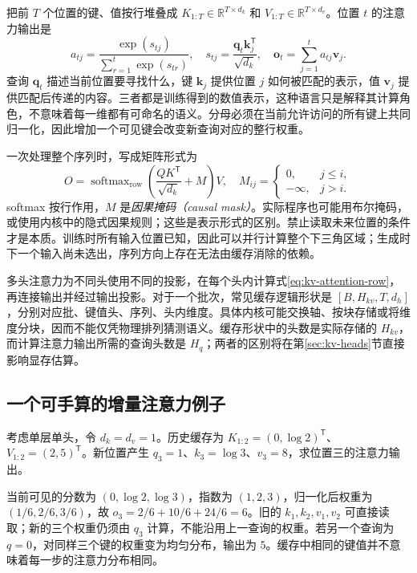 \documentclass[UTF8,12pt,a4paper,fontset=fandol]{ctexart}
\begin{document}
把前 $T$ 个位置的键、值按行堆叠成 $K_{1:T}\in\mathbb R^{T\times d_k}$ 和 $V_{1:T}\in\mathbb R^{T\times d_v}$。位置 $t$ 的注意力输出是
\begin{equation}
 a_{tj}=\frac{\exp(s_{tj})}{\sum_{r=1}^{t}\exp(s_{tr})},\quad
 s_{tj}=\frac{\mathbf q_t\mathbf k_j^{\mathsf T}}{\sqrt{d_k}},\quad
 \mathbf o_t=\sum_{j=1}^{t}a_{tj}\mathbf v_j.
 \label{eq:kv-attention-row}
\end{equation}
查询 $\mathbf q_t$ 描述当前位置要寻找什么，键 $\mathbf k_j$ 提供位置 $j$ 如何被匹配的表示，值 $\mathbf v_j$ 提供匹配后传递的内容。三者都是训练得到的数值表示，这种语言只是解释其计算角色，不意味着每一维都有可命名的语义。分母必须在当前允许访问的所有键上共同归一化，因此增加一个可见键会改变新查询对应的整行权重。

一次处理整个序列时，写成矩阵形式为
\begin{equation}
 O=\operatorname{softmax}_{\mathrm{row}}
 \left(\frac{QK^{\mathsf T}}{\sqrt{d_k}}+M\right)V,
 \quad M_{ij}=\begin{cases}0,&j\leq i,\\-\infty,&j>i.\end{cases}
 \label{eq:kv-masked-attention}
\end{equation}
softmax 按行作用，$M$ 是\emph{因果掩码（causal mask）}。实际程序也可能用布尔掩码，或使用内核中的隐式因果规则；这些是表示形式的区别。禁止读取未来位置的条件才是本质。训练时所有输入位置已知，因此可以并行计算整个下三角区域；生成时下一个输入尚未选出，序列方向上存在无法由缓存消除的依赖。

多头注意力为不同头使用不同的投影，在每个头内计算式\eqref{eq:kv-attention-row}，再连接输出并经过输出投影。对于一个批次，常见缓存逻辑形状是 $[B,H_{kv},T,d_h]$，分别对应批、键值头、序列、头内维度。具体内核可能交换轴、按块存储或将维度分块，因而不能仅凭物理排列猜测语义。缓存形状中的头数是实际存储的 $H_{kv}$，而计算注意力输出所需的查询头数是 $H_q$；两者的区别将在第\ref{sec:kv-heads}节直接影响显存估算。

\subsection{一个可手算的增量注意力例子}

\begin{example}[相同历史键值面对新的查询]
考虑单层单头，令 $d_k=d_v=1$。历史缓存为 $K_{1:2}=(0,\log 2)^{\mathsf T}$、$V_{1:2}=(2,5)^{\mathsf T}$。新位置产生 $q_3=1$、$k_3=\log 3$、$v_3=8$，求位置三的注意力输出。
\end{example}
\begin{solve}
当前可见的分数为 $(0,\log 2,\log 3)$，指数为 $(1,2,3)$，归一化后权重为 $(1/6,2/6,3/6)$，故 $o_3=2/6+10/6+24/6=6$。旧的 $k_1,k_2,v_1,v_2$ 可直接读取；新的三个权重仍须由 $q_3$ 计算，不能沿用上一查询的权重。若另一个查询为 $q=0$，对同样三个键的权重变为均匀分布，输出为 $5$。缓存中相同的键值并不意味着每一步的注意力分布相同。
\end{solve}
\end{document}
